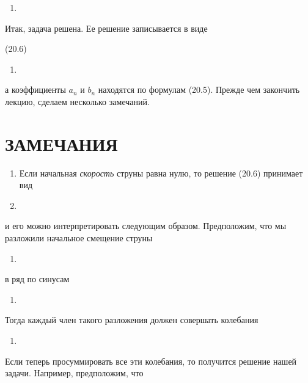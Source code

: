 \documentclass[
  ukrainian,
]{article}
\providecommand{\tightlist}{%
  \setlength{\itemsep}{0pt}\setlength{\parskip}{0pt}}
\begin{document}
\begin{enumerate}
\def\labelenumi{\arabic{enumi}.}
\setcounter{enumi}{11}
\tightlist
\item
\end{enumerate}

Итак, задача решена. Ее решение записывается в виде

(20.6)

\begin{enumerate}
\def\labelenumi{\arabic{enumi}.}
\setcounter{enumi}{12}
\tightlist
\item
\end{enumerate}

а коэффициенты \(a_n\) и \(b_n\) находятся по формулам (20.5). Прежде
чем закончить лекцию, сделаем несколько замечаний.

\section{ЗАМЕЧАНИЯ}\label{ux437ux430ux43cux435ux447ux430ux43dux438ux44f-7}

\begin{enumerate}
\def\labelenumi{\arabic{enumi}.}
\item
  Если начальная \emph{скорость} струны равна нулю, то решение (20.6)
  принимает вид
\item
\end{enumerate}

и его можно интерпретировать следующим образом. Предположим, что мы
разложили начальное смещение струны

\begin{enumerate}
\def\labelenumi{\arabic{enumi}.}
\setcounter{enumi}{14}
\tightlist
\item
\end{enumerate}

в ряд по синусам

\begin{enumerate}
\def\labelenumi{\arabic{enumi}.}
\setcounter{enumi}{15}
\tightlist
\item
\end{enumerate}

Тогда каждый член такого разложения должен совершать колебания

\begin{enumerate}
\def\labelenumi{\arabic{enumi}.}
\setcounter{enumi}{16}
\tightlist
\item
\end{enumerate}

Если теперь просуммировать все эти колебания, то получится решение нашей
задачи. Например, предположим, что
\end{document}
